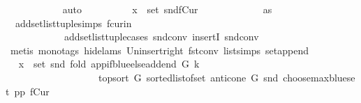 \begin{isabellebody}
\ \ \ \ \ \ \ \ \ \ \isamarkupfalse%
\ auto\isanewline
\ \ \ \ \ \ \ \ \isamarkupfalse%
\ {\isachardoublequoteopen}x\ {\isasymin}\ set\ {\isacharparenleft}{\kern0pt}snd{\isacharparenleft}{\kern0pt}fCur{\isacharparenright}{\kern0pt}{\isacharparenright}{\kern0pt}{\isachardoublequoteclose}\ \isanewline
\ \ \ \ \ \ \ \ \ \ \isamarkupfalse%
\ as{}\ \isamarkupfalse%
\ \ add{\isacharunderscore}{\kern0pt}set{\isacharunderscore}{\kern0pt}list{\isacharunderscore}{\kern0pt}tuple{\isachardot}{\kern0pt}simps\ fcur{\isacharunderscore}{\kern0pt}in\isanewline
\ \ \ \ \ \ \ \ \ \ \ \ add{\isacharunderscore}{\kern0pt}set{\isacharunderscore}{\kern0pt}list{\isacharunderscore}{\kern0pt}tuple{\isachardot}{\kern0pt}cases\ snd{\isacharunderscore}{\kern0pt}conv\ insertI{}\ snd{\isacharunderscore}{\kern0pt}conv\isanewline
\ \ \ \ \ \ \ \ \ \ \isamarkupfalse%
\ {\isacharparenleft}{\kern0pt}metis\ {\isacharparenleft}{\kern0pt}mono{\isacharunderscore}{\kern0pt}tags{\isacharcomma}{\kern0pt}\ hide{\isacharunderscore}{\kern0pt}lams{\isacharparenright}{\kern0pt}\ Un{\isacharunderscore}{\kern0pt}insert{\isacharunderscore}{\kern0pt}right\ fst{\isacharunderscore}{\kern0pt}conv\ list{\isachardot}{\kern0pt}simps{\isacharparenleft}{\kern0pt}{}{}{\isacharparenright}{\kern0pt}\ set{\isacharunderscore}{\kern0pt}append{\isacharparenright}{\kern0pt}\ \isanewline
\ \ \ \ \ \ \ \ \isamarkupfalse%
\ \isamarkupfalse%
\ {\isachardoublequoteopen}x\ {\isasymin}\ set\ {\isacharparenleft}{\kern0pt}snd\ {\isacharparenleft}{\kern0pt}fold\ {\isacharparenleft}{\kern0pt}app{\isacharunderscore}{\kern0pt}if{\isacharunderscore}{\kern0pt}blue{\isacharunderscore}{\kern0pt}else{\isacharunderscore}{\kern0pt}add{\isacharunderscore}{\kern0pt}end\ G\ k{\isacharparenright}{\kern0pt}\isanewline
\ \ \ \ \ \ \ \ \ \ \ \ \ \ \ \ \ \ \ {\isacharparenleft}{\kern0pt}top{\isacharunderscore}{\kern0pt}sort\ G\ {\isacharparenleft}{\kern0pt}sorted{\isacharunderscore}{\kern0pt}list{\isacharunderscore}{\kern0pt}of{\isacharunderscore}{\kern0pt}set\ {\isacharparenleft}{\kern0pt}anticone\ G\ {\isacharparenleft}{\kern0pt}snd\ {\isacharparenleft}{\kern0pt}choose{\isacharunderscore}{\kern0pt}max{\isacharunderscore}{\kern0pt}blue{\isacharunderscore}{\kern0pt}set\ pp{\isacharparenright}{\kern0pt}{\isacharparenright}{\kern0pt}{\isacharparenright}{\kern0pt}{\isacharparenright}{\kern0pt}{\isacharparenright}{\kern0pt}\ {\isacharparenleft}{\kern0pt}fCur{\isacharparenright}{\kern0pt}{\isacharparenright}{\kern0pt}{\isacharparenright}{\kern0pt}{\isachardoublequoteclose}\isanewline

\end{isabellebody}
